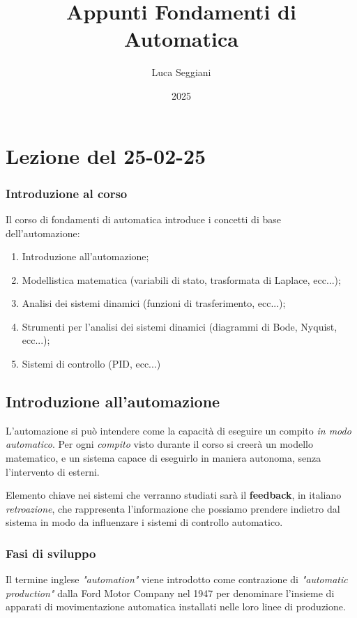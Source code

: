 \documentclass[a4paper,11pt]{article}
\title{Appunti Fondamenti di Automatica}
\author{Luca Seggiani}
\date{2025}
\begin{document}
\section{Lezione del 25-02-25}

\thispagestyle{empty}
\pagestyle{fancy}

\subsubsection{Introduzione al corso}
Il corso di fondamenti di automatica introduce i concetti di base dell'automazione:
\begin{enumerate}
	\item Introduzione all'automazione;
	\item Modellistica matematica (variabili di stato, trasformata di Laplace, ecc...);
	\item Analisi dei sistemi dinamici (funzioni di trasferimento, ecc...);
	\item Strumenti per l'analisi dei sistemi dinamici (diagrammi di Bode, Nyquist, ecc...);
	\item Sistemi di controllo (PID, ecc...)
\end{enumerate}

\subsection{Introduzione all'automazione}
L'automazione si può intendere come la capacità di eseguire un compito \textit{in modo automatico}.
Per ogni \textit{compito} visto durante il corso si creerà un modello matematico, e un sistema capace di eseguirlo in maniera autonoma, senza l'intervento di esterni.

Elemento chiave nei sistemi che verranno studiati sarà il \textbf{feedback}, in italiano \textit{retroazione}, che rappresenta l'informazione che possiamo prendere indietro dal sistema in modo da influenzare i sistemi di controllo automatico.

\subsubsection{Fasi di sviluppo}
Il termine inglese \textit{"automation"} viene introdotto come contrazione di \textit{"automatic production"} dalla Ford Motor Company nel 1947 per denominare l'insieme di apparati di movimentazione automatica installati nelle loro linee di produzione.
\end{document}
